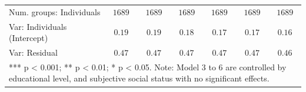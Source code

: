 \documentclass[
  12pt,
  a4paper,
]{article}
\begin{document}
\begin{table}[!ht]
\begin{center}
{\begin{tabular}{l c c c c c c}
Num. groups: Individuals            & $1689$        & $1689$        & $1689$        & $1689$        & $1689$        & $1689$        \\
Var: Individuals (Intercept)        & $0.19$        & $0.19$        & $0.18$        & $0.17$        & $0.17$        & $0.16$        \\
Var: Residual                       & $0.47$        & $0.47$        & $0.47$        & $0.47$        & $0.47$        & $0.46$        \\
\hline
\multicolumn{7}{l}{\scriptsize{*** p < 0.001; ** p < 0.01; * p < 0.05.
Note: Model 3 to 6 are controlled by educational level, and subjective social status with no significant effects.}}
\end{tabular}
}
\label{table:coefficients}
\end{center}
\end{table}
\end{document}
